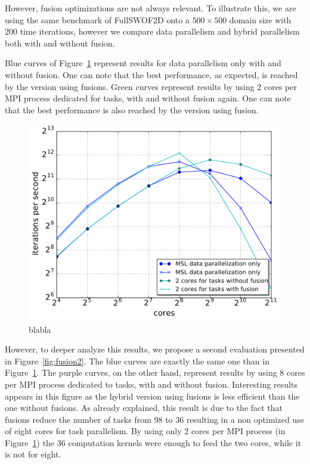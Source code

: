 However, fusion optimizations are not always relevant. To illustrate this, we are using the same benchmark of FullSWOF2D onto a $500 \times 500$ domain size with $200$ time iterations, however we compare data parallelism and hybrid parallelism both with and without fusion. 

Blue curves of Figure~\ref{fig:fusion1} represent results for data parallelism only with and without fusion. One can note that the best performance, as expected, is reached by the version using fusions. Green curves represent results by using 2 cores per MPI process dedicated for tasks, with and without fusion again. One can note that the best performance is also reached by the version using fusion.

\begin{figure}[!h]\begin{center}
  \includegraphics[width=.6\textwidth]{../results/task_scaling/500_200/withwithout2_close_median.pdf}
  \caption{blabla}
  \label{fig:fusion1}
\end{center}\end{figure}

However, to deeper analyze this results, we propose a second evaluation presented in Figure~\ref{fig:fusion2}. The blue curves are exactly the same one than in Figure~\ref{fig:fusion1}. The purple  curves, on the other hand, represent results by using 8 cores per MPI process dedicated to tasks, with and without fusion. Interesting results appears in this figure as the hybrid version using fusions is less efficient than the one without fusions. As already explained, this result is due to the fact that fusions reduce the number of tasks from 98 to 36 resulting in a non optimized use of eight cores for task parallelism. By using only 2 cores per MPI process (in Figure~\ref{fig:fusion1}) the 36 computation kernels were enough to feed the two cores, while it is not for eight.

